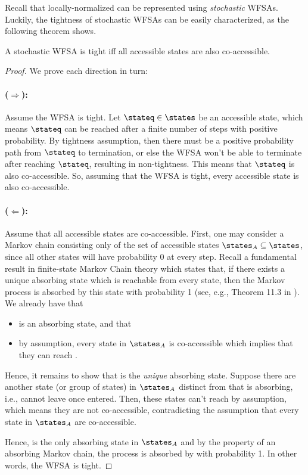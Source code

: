 Recall that locally-normalized \ngram{} can be represented using \emph{stochastic} WFSAs.
Luckily, the tightness of stochastic WFSAs can be easily characterized, as the following theorem shows.
\begin{theorem} \label{thm:sfslm-tight}
A stochastic WFSA is tight iff all accessible states are also co-accessible.
\end{theorem}
\begin{proof}
We prove each direction in turn:

\paragraph{($\Rightarrow$):}  Assume the WFSA is tight. Let $\stateq\in \states$ be an accessible state, which means  $\stateq$ can be reached after a finite number of steps with positive probability. 
By tightness assumption, then there must be a positive probability path from $\stateq$ to termination, or else the WFSA won't be able to terminate after reaching $\stateq$, resulting in non-tightness. 
This means that $\stateq$ is also co-accessible. 
So, assuming that the WFSA is tight, every accessible state is also co-accessible.

\paragraph{($\Leftarrow$):} 
Assume that all accessible states are co-accessible. 
First, one may consider a Markov chain consisting only of the set of accessible states $\states_A\subseteq \states$, since all other states will have probability 0 at every step. Recall a fundamental result in finite-state Markov Chain theory which states that, if there exists a unique absorbing state which is reachable from every state, then the Markov process is absorbed by this state with probability 1 (see, e.g., Theorem 11.3 in \citealp{grinstead1997}). We already have that
\begin{itemize}
    \item \eos{} is an absorbing state, and that
    \item by assumption, every state in $\states_A$ is co-accessible which implies that they can reach \eos.
\end{itemize}
Hence, it remains to show that \eos{} is the \emph{unique} absorbing state. Suppose there are another state (or group of states) in $\states_A$ distinct from \eos{} that is absorbing, i.e., cannot leave once entered. Then, these states can't reach \eos{} by assumption, which means they are not co-accessible, contradicting the assumption that every state in $\states_A$ are co-accessible.

Hence, \eos{} is the only absorbing state in $\states_A$ and by the property of an absorbing Markov chain, the process is absorbed by \eos{} with probability 1. In other words, the WFSA is tight.

\end{proof}

